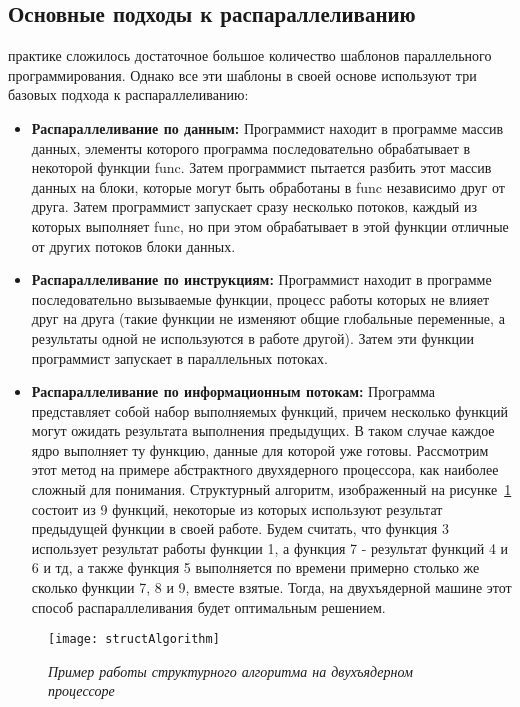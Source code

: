 { %
	\subsection{Основные подходы к распараллеливанию}
	\Large{} практике сложилось достаточное большое количество шаблонов параллельного программирования. Однако все эти шаблоны в своей основе используют три базовых подхода к распараллеливанию:
	\begin{itemize}
		\item\textbf{Распараллеливание по данным:} Программист находит в программе массив данных, элементы которого программа последовательно обрабатывает в некоторой функции func. Затем программист пытается разбить этот массив данных на блоки, которые могут быть обработаны в func независимо друг от друга. Затем программист запускает сразу несколько потоков, каждый из которых выполняет func, но при этом обрабатывает в этой функции отличные от других потоков блоки данных.
		\item\textbf{Распараллеливание по инструкциям:} Программист находит в программе последовательно вызываемые функции, процесс работы которых не влияет друг на друга (такие функции не изменяют общие глобальные переменные, а результаты одной не используются в работе другой). Затем эти функции программист запускает в параллельных потоках.
		\item\textbf{Распараллеливание по информационным потокам:} Программа представляет собой набор выполняемых функций, причем несколько функций могут ожидать результата выполнения предыдущих. В таком случае каждое ядро выполняет ту функцию, данные для которой уже готовы. Рассмотрим этот метод на примере абстрактного двухядерного процессора, как наиболее сложный для понимания. Структурный алгоритм, изображенный на рисунке~\ref{structAlgorithm:image} состоит из 9 функций, некоторые из которых используют результат предыдущей функции в своей работе. Будем считать, что функция 3 использует результат работы функции 1, а функция 7 - результат функций 4 и 6 и тд, а также функция 5 выполняется по времени примерно столько же сколько функции 7, 8 и 9, вместе взятые. Тогда, на двухъядерной машине этот способ распараллеливания будет оптимальным решением.
	\end{itemize}
	\begin{figure}[H]
		\texttt{[image: structAlgorithm]}
		\caption{\textit{Пример работы структурного алгоритма на двухъядерном процессоре}}
		\label{structAlgorithm:image}
	\end{figure}
}
